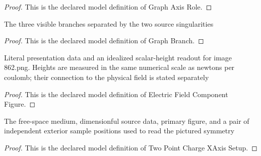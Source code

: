 \begin{proof}
  This is the declared model definition of Graph Axis Role.
\end{proof}
\begin{definition}
  \label{def:physics:phyx-mini-0862:phyxminiproblems-problemphyxmini0862-graphbranch}
  The three visible branches separated by the two source singularities
\end{definition}
\begin{proof}
  This is the declared model definition of Graph Branch.
\end{proof}
\begin{definition}
  \label{def:physics:phyx-mini-0862:phyxminiproblems-problemphyxmini0862-electricfieldcomponentfigure}
  Literal presentation data and an idealized scalar-height readout for image 862.png. Heights are measured in the same numerical scale as newtons per coulomb; their connection to the physical field is stated separately
\end{definition}
\begin{proof}
  This is the declared model definition of Electric Field Component Figure.
\end{proof}
\begin{definition}
  \label{def:physics:phyx-mini-0862:phyxminiproblems-problemphyxmini0862-twopointchargexaxissetup}
  The free-space medium, dimensionful source data, primary figure, and a pair of independent exterior sample positions used to read the pictured symmetry
\end{definition}
\begin{proof}
  This is the declared model definition of Two Point Charge XAxis Setup.
\end{proof}
